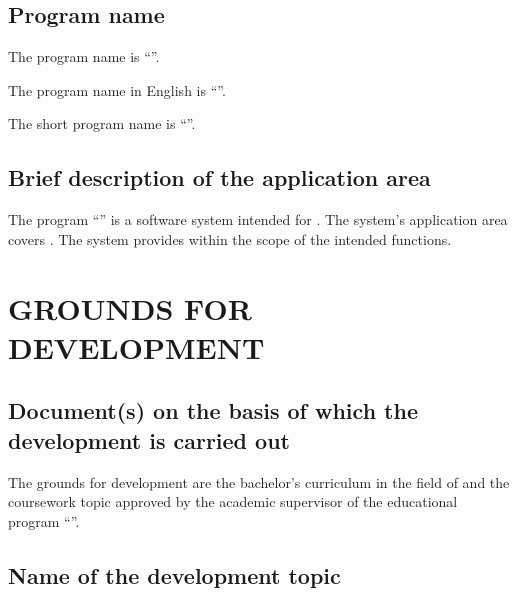 \documentclass[12pt,a4paper]{extarticle}
\begin{document}
\subsection{Program name}

The program name is \enquote{\projectname}.

The program name in English is \enquote{\hseProjectNameEn}.

The short program name is \enquote{\hseProjectNameShort}.

\subsection{Brief description of the application area}

The program \enquote{\projectname} is a software system intended for . The system's application area covers . The system provides  within the scope of the intended functions.

\clearpage

\section{GROUNDS FOR DEVELOPMENT}

\subsection{Document(s) on the basis of which the development is carried out}

The grounds for development are the bachelor's curriculum in the field of  and the coursework topic approved by the academic supervisor of the educational program \enquote{\hseSpecialization}.

\subsection{Name of the development topic}
\end{document}
